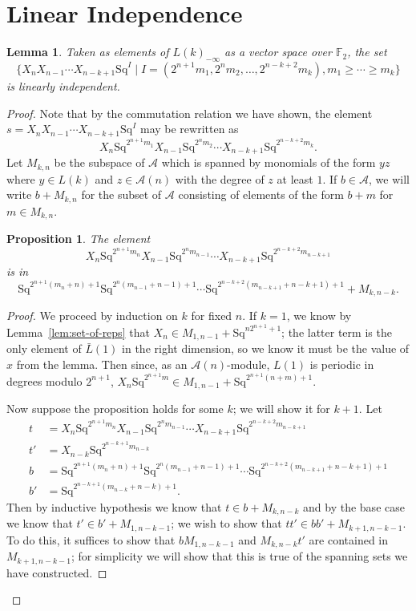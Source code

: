\documentclass{article}
\newcommand{\A}{\mathcal{A}}
\newcommand{\F}{\mathbb{F}}
\newcommand{\Sq}{\mathrm{Sq}}
\renewcommand{\L}{\bar{L}}
\newcommand{\Lkm}[1][k]{L{(#1)}_{-\infty}}
\newtheorem{prop}{Proposition}
\newtheorem{lem}{Lemma}
\begin{document}
\section{Linear Independence}\label{sec:li}

\begin{lem}\label{lem:li-vs}
  Taken as elements of $\Lkm$ as a vector space over $\F_2$, the set
  \[\{X_nX_{n-1}\cdots X_{n-k+1}\Sq^I\mid I=(2^{n+1}m_1,2^nm_2,\ldots,2^{n-k+2}m_k), m_1\geq\cdots\geq m_k\}\]
  is linearly independent.
\end{lem}
\begin{proof}
  Note that by the commutation relation we have shown, the element $s=X_nX_{n-1}\cdots X_{n-k+1}\Sq^I$ may be rewritten as
  \[X_n\Sq^{2^{n+1}m_1}X_{n-1}\Sq^{2^nm_2}\cdots X_{n-k+1}\Sq^{2^{n-k+2}m_k}.\]
  Let $M_{k,n}$ be the subspace of $\A$ which is spanned by monomials of the form $yz$ where $y\in L(k)$ and $z\in \A(n)$ with the degree of $z$ at least $1$.  If $b\in \A$, we will write $b+M_{k,n}$ for the subset of $\A$ consisting of elements of the form $b+m$ for $m\in M_{k,n}$.

  \begin{prop}\label{prop:m-thing}
    The element
    \[X_n\Sq^{2^{n+1}m_n}X_{n-1}\Sq^{2^nm_{n-1}}\cdots X_{n-k+1}\Sq^{2^{n-k+2}m_{n-k+1}}\]
    is in
    \[\Sq^{2^{n+1}(m_n+n)+1}\Sq^{2^n(m_{n-1}+n-1)+1}\cdots\Sq^{2^{n-k+2}(m_{n-k+1}+n-k+1)+1} + M_{k,n-k}.\]
  \end{prop}
  \begin{proof}

    We proceed by induction on $k$ for fixed $n$.  If $k=1$, we know by Lemma~\ref{lem:set-of-reps} that $X_n\in M_{1,n-1}+\Sq^{n2^{n+1}+1}$; the latter term is the only element of $\L(1)$ in the right dimension, so we know it must be the value of $x$ from the lemma.  Then since, as an $\A(n)$-module, $L(1)$ is periodic in degrees modulo $2^{n+1}$, $X_n\Sq^{2^{n+1}m}\in M_{1,n-1}+\Sq^{2^{n+1}(n+m)+1}$.

  Now suppose the proposition holds for some $k$; we will show it for $k+1$.  Let 
  \begin{align*}
  t&=X_n\Sq^{2^{n+1}m_n}X_{n-1}\Sq^{2^nm_{n-1}}\cdots X_{n-k+1}\Sq^{2^{n-k+2}m_{n-k+1}} \\
  t'&=X_{n-k}\Sq^{2^{n-k+1}m_{n-k}} \\
  b&=\Sq^{2^{n+1}(m_n+n)+1}\Sq^{2^n(m_{n-1}+n-1)+1}\cdots\Sq^{2^{n-k+2}(m_{n-k+1}+n-k+1)+1} \\
  b'&=\Sq^{2^{n-k+1}(m_{n-k}+n-k)+1}.
  \end{align*}
  Then by inductive hypothesis we know that $t\in b+M_{k,n-k}$ and by the base case we know that $t'\in b'+M_{1,n-k-1}$; we wish to show that $tt'\in bb'+M_{k+1,n-k-1}$.  To do this, it suffices to show that $bM_{1,n-k-1}$ and $M_{k,n-k}t'$ are contained in $M_{k+1,n-k-1}$; for simplicity we will show that this is true of the spanning sets we have constructed.
  

\end{proof}
\end{proof}
\end{document}
